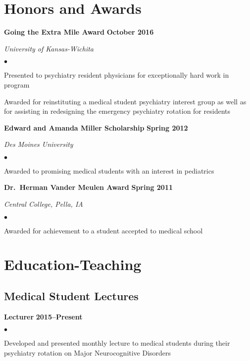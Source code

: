 \documentclass[11pt,letterpaper]{article}
\renewenvironment{itemize}{
  \begin{list}{}{
      \setlength{\leftmargin}{1.5em}
      \setlength{\itemsep}{0.25em}
      \setlength{\parskip}{0pt}
      \setlength{\parsep}{0.25em}
    }
  }{
  \end{list}
}
\newenvironment{bitemize}{
  \begin{list}{\(\bullet \)}{
      \setlength{\leftmargin}{1.5em}
      \setlength{\itemsep}{0.25em}
      \setlength{\parskip}{0pt}
      \setlength{\parsep}{0.25em}
    }
  }{
  \end{list}
}
\newcommand{\yearrange}[1]{\hfill \textbf{#1} \par}
\begin{document}
\section*{Honors and Awards}
\begin{itemize}
  \item \textbf{Going the Extra Mile Award} \yearrange{October 2016}
    \textit{University of Kansas-Wichita}
    \begin{bitemize}
      \item Presented to psychiatry resident physicians for exceptionally hard work in
        program
      \item Awarded for reinstituting a medical student psychiatry interest group as well 
        as for assisting in redesigning the emergency psychiatry rotation for residents
    \end{bitemize}
  \item \textbf{Edward and Amanda Miller Scholarship} \yearrange{Spring 2012}
    \textit{Des Moines University}
    \begin{bitemize}
      \item Awarded to promising medical students with an interest in pediatrics
    \end{bitemize}
  \item \textbf{Dr.\ Herman Vander Meulen Award} \yearrange{Spring 2011}
    \textit{Central College, Pella, IA}
    \begin{bitemize}
      \item Awarded for achievement to a student accepted to medical school
    \end{bitemize}
\end{itemize}

\section*{Education-Teaching}
\subsection*{Medical Student Lectures}
\begin{itemize}
  \item \textbf{Lecturer} \yearrange{2015--Present}
  \begin{bitemize}
    \item Developed and presented monthly lecture to medical students during their psychiatry rotation on 
      Major Neurocognitive Disorders
  \end{bitemize}
\end{itemize}
\end{document}
